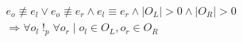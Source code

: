 \begin{equation} \label{eq:conflict_3.5}
\begin{split}
& e_{o} \not\equiv e_{l} \vee e_{o} \not\equiv e_{r} \wedge e_{l} \equiv e_{r} \wedge |O_{L}| > 0 \wedge |O_{R}| > 0\\
& \Rightarrow \forall o_{l} \;!_{p}\; \forall o_{r} \;|\; o_{l} \in O_{L}, o_{r} \in O_{R}
\end{split}
\end{equation} 
%

